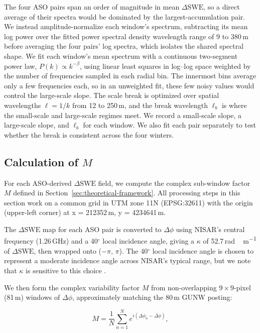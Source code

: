 \documentclass[tc, manuscript]{copernicus}
\begin{document}
The four ASO pairs span an order of magnitude in mean $\Delta\mathrm{SWE}$, so a direct average of their spectra would be dominated by the largest-accumulation pair. We instead amplitude-normalize each window's spectrum, subtracting its mean log power over the fitted power spectral density wavelength range of 9 to 380\,\unit{m} before averaging the four pairs' log spectra, which isolates the shared spectral shape. We fit each window's mean spectrum with a continuous two-segment power law, $P(k)\propto k^{-\beta}$, using linear least squares in log--log space weighted by the number of frequencies sampled in each radial bin. The innermost bins average only a few frequencies each, so in an unweighted fit, these few noisy values would control the large-scale slope. The scale break is optimized over spatial wavelengths $\ell=1/k$ from 12 to 250\,\unit{m}, and the break wavelength $\ell_b$ is where the small-scale and large-scale regimes meet. We record a small-scale slope, a large-scale slope, and $\ell_b$ for each window. We also fit each pair separately to test whether the break is consistent across the four winters.

\subsection{Calculation of $M$}\label{subsec:calc-M}

For each ASO-derived $\Delta\mathrm{SWE}$ field, we compute the complex sub-window factor $M$ defined in Section~\ref{sec:theoretical-framework}. All processing steps in this section work on a common grid in UTM zone 11N (EPSG:32611) with the origin (upper-left corner) at x = 212352\,\unit{m}, y = 4234641\,\unit{m}.

The $\Delta\mathrm{SWE}$ map for each ASO pair is converted to $\Delta\phi$ using NISAR's central frequency (1.26\,\unit{GHz}) and a 40$^{\circ}$ local incidence angle, giving a $\kappa$ of 52.7\,\unit{rad\,m^{-1}} of $\Delta\mathrm{SWE}$, then wrapped onto ($-\pi$, $\pi$). The 40$^{\circ}$ local incidence angle is chosen to represent a moderate incidence angle across NISAR's typical range, but we note that $\kappa$ is sensitive to this choice \citep{Leinss2015}.

We then form the complex variability factor $M$ from non-overlapping $9\times9$-pixel (81\,\unit{m}) windows of $\Delta\phi$, approximately matching the 80\,\unit{m} GUNW posting:

\begin{equation}\label{eq:calc_m}
    M = \frac{1}{N}\sum_{n=1}^{N} e^{i(\Delta\phi_n - \overline{\Delta\phi})},
\end{equation}
\end{document}
